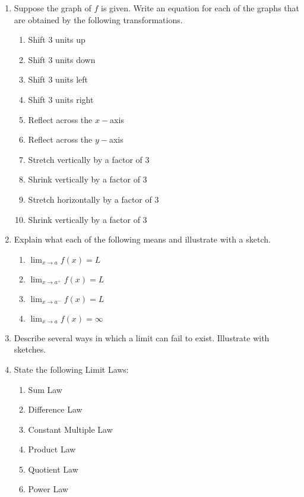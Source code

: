 \begin{enumerate}
\item Suppose the graph of \(f\) is given. Write an equation for each of the graphs that are obtained by the following transformations.
\begin{enumerate}
\item Shift 3 units up
\item Shift 3 units down
\item Shift 3 units left
\item Shift 3 units right
\item Reflect across the \(x-\)axis
\item Reflect across the \(y-\)axis
\item Stretch vertically by a factor of 3
\item Shrink vertically by a factor of 3
\item Stretch horizontally by a factor of 3
\item Shrink vertically by a factor of 3
\end{enumerate}

\item Explain what each of the following means and illustrate with a sketch.
\begin{enumerate}
\item \(\displaystyle \lim_{x\rightarrow a} f(x) = L\)
\item \(\displaystyle \lim_{x\rightarrow a^+} f(x) = L\)
\item \(\displaystyle \lim_{x\rightarrow a^-} f(x) = L\)
\item \(\displaystyle \lim_{x\rightarrow a} f(x) = \infty\)
\end{enumerate}

\item Describe several ways in which a limit can fail to exist. Illustrate with sketches.

\item State the following Limit Laws:
\begin{enumerate}
\item Sum Law
\item Difference Law
\item Constant Multiple Law
\item Product Law
\item Quotient Law
\item Power Law
\end{enumerate}

\end{enumerate}


